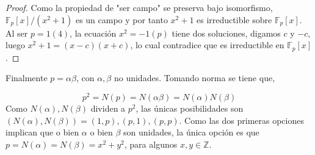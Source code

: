 \documentclass[11pt,letterpaper]{article}
\begin{document}
\begin{proof}
Como la propiedad de "ser campo" se preserva bajo isomorfismo, $\mathbb{F}_p[x]/(x^2+1)$ es un campo y por tanto $x^2+1$ es irreductible sobre $\mathbb{F}_p[x]$. Al ser $p=1(4)$, la ecuación $x^2 = -1(p)$ tiene dos soluciones, digamos $c$ y $-c$, luego $x^2+1=(x-c)(x+c)$, lo cual contradice que es irreductible en $\mathbb{F}_p[x]$.
\end{proof}
Finalmente $p=\alpha\beta$, con $\alpha,\beta$ no unidades. Tomando norma se tiene que,

\[
p^2 = N(p) = N(\alpha\beta)=N(\alpha)N(\beta)
\]
Como $N(\alpha),N(\beta)$ dividen a $p^2$, las únicas posibilidades son $(N(\alpha),N(\beta)) = (1,p),(p,1),(p,p)$. Como las dos primeras opciones implican que o bien $\alpha$ o bien $\beta$ son unidades, la única opción es que $p=N(\alpha) = N(\beta) = x^2+y^2$, para algunos $x,y\in\mathbb{Z}$.
\end{document}
